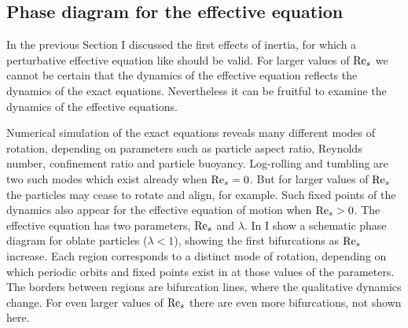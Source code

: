 \documentclass[thesis.tex]{subfiles}
\begin{document}
\subsection*{Phase diagram for the effective equation}
In the previous Section I discussed the first effects of inertia, for which a perturbative effective equation like  should be valid. For larger values of $\textrm{Re}_s$ we cannot be certain that the dynamics of the effective equation reflects the dynamics of the exact equations. Nevertheless it can be fruitful to examine the dynamics of the effective equations.

Numerical simulation of the exact equations reveals many different modes of rotation, depending on parameters such as particle aspect ratio, Reynolds number, confinement ratio and particle buoyancy. Log-rolling and tumbling are two such modes which exist already when $\textrm{Re}_s=0$. But for larger values of $\textrm{Re}_s$ the particles may cease to rotate and align, for example. Such fixed points of the dynamics also appear for the effective equation of motion  when $\textrm{Re}_s>0$. The effective equation has two parameters, $\textrm{Re}_s$ and $\lambda$. In  I show a schematic phase diagram for oblate particles ($\lambda<1$), showing the first bifurcations as $\textrm{Re}_s$ increase. Each region corresponds to a distinct mode of rotation, depending on which periodic orbits and fixed points exist in  at those values of the parameters. The borders between regions are bifurcation lines, where the qualitative dynamics change. For even larger values of $\textrm{Re}_s$ there are even more bifurcations, not shown here.
\end{document}
